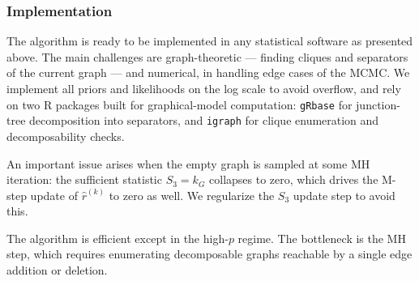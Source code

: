 \subsubsection{Implementation}
The algorithm is ready to be implemented in any statistical software as presented above. The main challenges are graph-theoretic --- finding cliques and separators of the current graph --- and numerical, in handling edge cases of the MCMC. We implement all priors and likelihoods on the log scale to avoid overflow, and rely on two R packages built for graphical-model computation: \texttt{gRbase} \parencite{gRbase} for junction-tree decomposition into separators, and \texttt{igraph} \parencite{igraph} for clique enumeration and decomposability checks. 


An important issue arises when the empty graph is sampled at some MH iteration: the sufficient statistic $S_3 = k_G$ collapses to zero, which drives the M-step update of $\hat r^{(k)}$ to zero as well. We regularize the $S_3$ update step to avoid this.

The algorithm is efficient except in the high-$p$ regime. The bottleneck is the MH step, which requires enumerating decomposable graphs reachable by a single edge addition or deletion. %